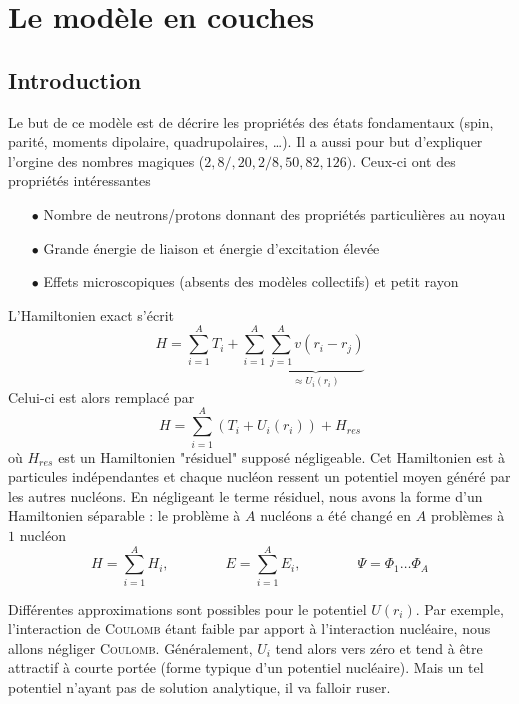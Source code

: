 \chapter{Le modèle en couches}
\section{Introduction}
Le but de ce modèle est de décrire les propriétés des états fondamentaux (spin, parité, moments dipolaire, 
quadrupolaires, \dots). Il a aussi pour but d'expliquer l'orgine des nombres magiques ($2,8/,20,2/8,50,82,126)$. 
Ceux-ci ont des propriétés intéressantes
\begin{itemize}
\item[$\bullet$] Nombre de neutrons/protons donnant des propriétés particulières au noyau
\item[$\bullet$] Grande énergie de liaison et énergie d'excitation élevée
\item[$\bullet$] Effets microscopiques (absents des modèles collectifs) et petit rayon
\end{itemize}

L'Hamiltonien exact s'écrit
\begin{equation}
H = \sum_{i=1}^A T_i +\sum_{i=1}^A\underbrace{\sum_{j=1}^A v(r_i-r_j)}_{\approx U_i(r_i)}
\end{equation}
Celui-ci est alors remplacé par
\begin{equation}
H = \sum_{i=1}^A (T_i+U_i(r_i)) + H_{res}
\end{equation}
où $H_{res}$ est un Hamiltonien "résiduel" supposé négligeable. Cet Hamiltonien est à particules indépendantes et
chaque nucléon ressent un potentiel moyen généré par les autres nucléons. En négligeant le terme résiduel, nous
avons la forme d'un Hamiltonien séparable : le problème à $A$ nucléons a été changé en $A$ problèmes à $1$ 
nucléon
\begin{equation}
H = \sum_{i=1}^A H_i,\qquad\qquad E = \sum_{i=1}^A E_i, \qquad\qquad \Psi = \Phi_1\dots\Phi_A
\end{equation}

Différentes approximations sont possibles pour le potentiel $U(r_i)$. Par exemple, l'interaction de \textsc{Coulomb}
étant faible par apport à l'interaction nucléaire, nous allons négliger \textsc{Coulomb}. Généralement, $U_i$ tend
alors vers zéro et tend à être attractif à courte portée (forme typique d'un potentiel nucléaire). Mais un tel
potentiel n'ayant pas de solution analytique, il va falloir ruser.



